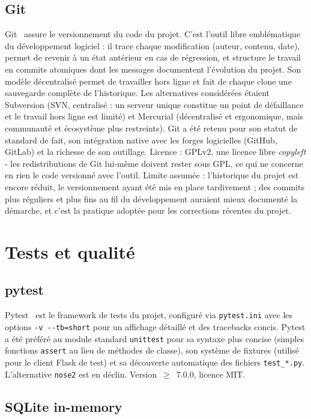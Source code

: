 \documentclass[12pt,a4paper,openany]{report}
\newcommand{\file}[1]{\texttt{#1}}
\begin{document}
\subsection{Git}
Git~\cite{git} assure le versionnement du code du projet. C'est l'outil libre emblématique du développement logiciel : il trace chaque modification (auteur, contenu, date), permet de revenir à un état antérieur en cas de régression, et structure le travail en commits atomiques dont les messages documentent l'évolution du projet. Son modèle décentralisé permet de travailler hors ligne et fait de chaque clone une sauvegarde complète de l'historique. Les alternatives considérées étaient Subversion (SVN, centralisé : un serveur unique constitue un point de défaillance et le travail hors ligne est limité) et Mercurial (décentralisé et ergonomique, mais communauté et écosystème plus restreints). Git a été retenu pour son statut de standard de fait, son intégration native avec les forges logicielles (GitHub, GitLab) et la richesse de son outillage. Licence : GPLv2, une licence libre \emph{copyleft} - les redistributions de Git lui-même doivent rester sous GPL, ce qui ne concerne en rien le code versionné avec l'outil. Limite assumée : l'historique du projet est encore réduit, le versionnement ayant été mis en place tardivement ; des commits plus réguliers et plus fins au fil du développement auraient mieux documenté la démarche, et c'est la pratique adoptée pour les corrections récentes du projet.

\section{Tests et qualité}

\subsection{pytest}
Pytest~\cite{pytest} est le framework de tests du projet, configuré via \file{pytest.ini} avec les options \texttt{-v -{}-tb=short} pour un affichage détaillé et des tracebacks concis. Pytest a été préféré au module standard \texttt{unittest} pour sa syntaxe plus concise (simples fonctions \texttt{assert} au lieu de méthodes de classe), son système de fixtures (utilisé pour le client Flask de test) et sa découverte automatique des fichiers \texttt{test\_*.py}. L'alternative \texttt{nose2} est en déclin. Version~$\geq$~7.0.0, licence MIT.

\subsection{SQLite in-memory}
\end{document}

